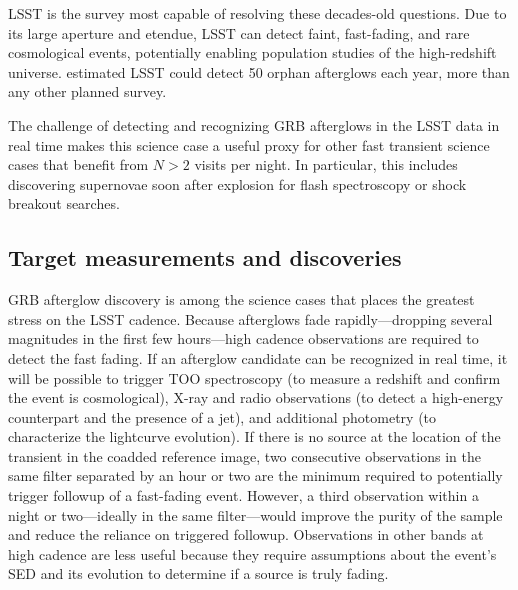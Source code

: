 LSST is the survey most capable of resolving these decades-old
questions.  Due to its large aperture and etendue, LSST can detect
faint, fast-fading, and rare cosmological events, potentially enabling
population studies of the high-redshift universe.
\citet{2015A&A...578A..71G} estimated LSST could detect 50 orphan
afterglows each year, more than any other planned survey.




The challenge of detecting and recognizing GRB afterglows in the LSST data in
real time makes this science case a useful proxy for other fast transient
science cases that benefit from $N > 2$ visits per night.  In particular, this
includes discovering supernovae soon after explosion for flash spectroscopy or
shock breakout searches.



\subsection{Target measurements and discoveries}
\label{sec:\secname:targets}

GRB afterglow discovery is among the science cases that places the
greatest stress on the LSST cadence.  Because afterglows fade
rapidly---dropping several magnitudes in the first few hours---high
cadence observations are required to detect the fast fading. If an
afterglow candidate can be recognized in real time, it will be possible
to trigger TOO spectroscopy (to measure a redshift and confirm the event
is cosmological), X-ray and radio observations (to detect a high-energy
counterpart and the presence of a jet), and additional photometry (to
characterize the lightcurve evolution).  If there is no source at the
location of the transient in the coadded reference image, two
consecutive observations in the same filter separated by an hour or two
are the minimum required to potentially trigger followup of a
fast-fading event. However, a third observation within a night or
two---ideally in the same filter---would improve the purity of the
sample and reduce the reliance on triggered followup. Observations in
other bands at high cadence are less useful because they require
assumptions about the event's SED and its evolution to determine if a
source is truly fading.

